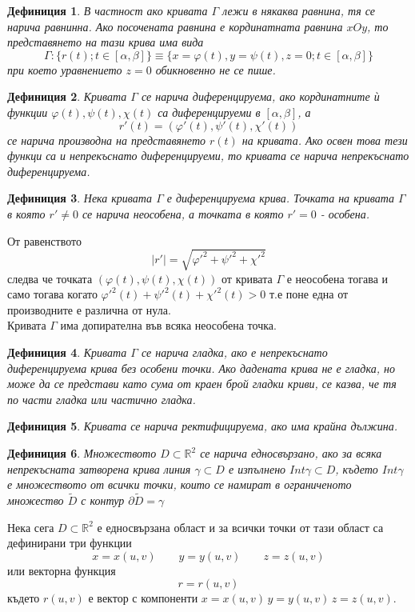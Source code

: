 \documentclass[a4paper,fleqn,12pt]{article}
\newtheorem{definition}{Дефиниция}[subsection]
\theoremstyle{definition}
\begin{document}
\begin{definition}
В частност ако кривата $\Gamma$ лежи в някаква равнина, тя се нарича равнинна. 
Ако посочената равнина е кординатната равнина $xOy$, то представянето на тази крива има вида 
$$\Gamma: \{r(t); t \in [\alpha, \beta] \} \equiv \{x = \varphi(t), y = \psi(t), z = 0 ; t \in [\alpha, \beta] \}$$
при което уравнението $z = 0$ обикновенно не се пише.
\end{definition}

\begin{definition}
Кривата $\Gamma$ се нарича диференцируема, ако кординатните ѝ функции $ \varphi(t), \psi(t), \chi(t)$ са диференцируеми в $[\alpha, \beta]$, а
$$r'(t) = ( \varphi'(t), \psi'(t), \chi'(t))$$
се нарича производна на представянето $r(t)$ на кривата. Ако освен това тези функци са и непрекъснато диференцируеми, то кривата се нарича непрекъснато диференцируема. 
\end{definition}

\begin{definition}
Нека кривата $\Gamma$ е диференцируема крива. 
Точката на кривата $\Gamma$ в която $r' \neq 0$ се нарича неособена, а точката в която $r'=0$ - особена.
\end{definition}
От равенството
$$|r'| = \sqrt{ \varphi'^2 + \psi'^2 + \chi'^2}$$
следва че точката $( \varphi(t), \psi(t), \chi(t))$ от кривата $\Gamma$ е неособена тогава и само тогава когато $\varphi'^2 (t)+ \psi'^2 (t) + \chi'^2 (t) > 0$ т.е поне една от производните е различна от нула. \\
Кривата $\Gamma$ има допирателна във всяка неособена точка. 

\begin{definition}
Кривата $\Gamma$ се нарича гладка, ако е непрекъснато диференцируема крива без особени точки.
Ако дадената крива не е гладка, но може да се представи като сума от краен брой гладки криви, се казва, че тя по части гладка или частично гладка. 
\end{definition}

\begin{definition}
Кривата се нарича ректифицируема, ако има крайна дължина. 
\end{definition}

\begin{definition}
Множеството $D \subset \mathbb{R}^2$ се нарича едносвързано, ако за всяка непрекъсната затворена крива линия $\gamma \subset D$ е изпълнено $Int \gamma \subset D$, където $Int \gamma$ е множеството от всички точки, които се намират в ограниченото множество $\widetilde{D}$ с контур $\partial \widetilde{D} = \gamma$
\end{definition}
Нека сега $D \subset \mathbb{R}^2$ е едносвързана област и за всички точки от тази област са дефинирани три функции
$$x = x(u,v) \qquad y = y(u,v) \qquad  z = z(u,v) $$
или векторна функция 
$$r = r(u,v)$$
където $r(u,v)$ е вектор с компоненти $x = x(u,v) \, y = y(u,v) \, z = z(u,v)$.
\end{document}
